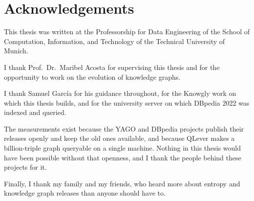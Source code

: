 \chapter*{Acknowledgements}

This thesis was written at the Professorship for Data Engineering of the School
of Computation, Information, and Technology of the Technical University of
Munich.

I thank Prof.~Dr.~Maribel Acosta for supervising this thesis and for the
opportunity to work on the evolution of knowledge graphs.

I thank Samuel García for his guidance throughout, for the Knowgly work on which
this thesis builds, and for the university server on which DBpedia 2022 was
indexed and queried.

The measurements exist because the YAGO and DBpedia projects publish their
releases openly and keep the old ones available, and because QLever makes a
billion-triple graph queryable on a single machine. Nothing in this thesis would
have been possible without that openness, and I thank the people behind these
projects for it.

Finally, I thank my family and my friends, who heard more about entropy and
knowledge graph releases than anyone should have to.
